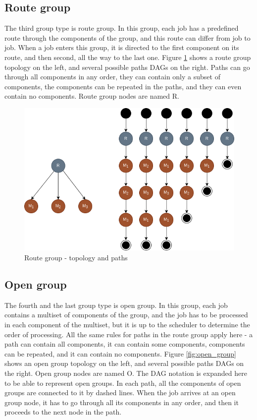 \subsection{Route group}

The third group type is route group. In this group, each job has a predefined route through the components of the group, and this route can differ from job to job. When a job enters this group, it is directed to the first component on its route, and then second, all the way to the last one. Figure \ref{fig:route_group} shows a route group topology on the left, and several possible paths DAGs on the right. Paths can go through all components in any order, they can contain only a subset of components, the components can be repeated in the paths, and they can even contain no components. Route group nodes are named R.

\begin{figure}[!htbp]
	\centering
	\includegraphics[scale=0.6]{../images/route_group.png}
	\caption{Route group - topology and paths}
    \label{fig:route_group}
\end{figure}

\subsection{Open group}

The fourth and the last group type is open group. In this group, each job contains a multiset of components of the group, and the job has to be processed in each component of the multiset, but it is up to the scheduler to determine the order of processing. All the same rules for paths in the route group apply here - a path can contain all components, it can contain some components, components can be repeated, and it can contain no components. Figure \ref{fig:open_group} shows an open group topology on the left, and several possible paths DAGs on the right. Open group nodes are named O. The DAG notation is expanded here to be able to represent open groups. In each path, all the components of open groups are connected to it by dashed lines. When the job arrives at an open group node, it has to go through all its components in any order, and then it proceeds to the next node in the path.

